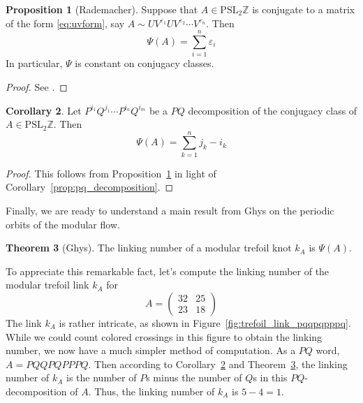\documentclass[12pt,twoside]{reedthesis}
\theoremstyle{definition}
\newtheorem{thm}{Theorem}[chapter]
\newtheorem{cor}[thm]{Corollary}
\newtheorem{prop}[thm]{Proposition}
\newcommand{\Z}{\mathbb{Z}}
\newcommand{\PSLZ}{\mathrm{PSL}_2{\Z}}
\begin{document}
\begin{prop}[Rademacher]\label{prop:rademacher_class_sum}
  Suppose that $A \in \PSLZ$ is conjugate to a matrix of the form \eqref{eq:uvform}, say $A \sim U V^{\varepsilon_1} U V^{\varepsilon_2} \cdots V^{\varepsilon_{n}}$.
  Then
  \begin{equation*}
    \Psi(A) = \sum_{i=1}^n \varepsilon_i
  \end{equation*}
  In particular, $\Psi$ is constant on conjugacy classes.
\end{prop}

\begin{proof}
  See \cite[58-60]{rademacher1972}.
\end{proof}

\begin{cor}\label{cor:rademacher_class_function_pq}
  Let $P^{i_1} Q^{j_1} \cdots P^{i_n} Q^{i_m}$ be a $PQ$ decomposition of the conjugacy class of $A \in \PSLZ$.
  Then
  \begin{equation*}
    \Psi(A) = \sum_{k=1}^n j_k - i_k
  \end{equation*}
\end{cor}

\begin{proof}
  This follows from Proposition~\ref{prop:rademacher_class_sum} in light of Corollary~\ref{prop:pq_decomposition}.
\end{proof}

Finally, we are ready to understand a main result from Ghys on the periodic orbits of the modular flow.

\begin{thm}[Ghys]\label{thm:ghys}
  The linking number of a modular trefoil knot $k_A$ is $\Psi(A)$.
\end{thm}

To appreciate this remarkable fact, let's compute the linking number of the modular trefoil link $k_A$ for
\begin{equation*}
  A = \begin{pmatrix}
    32 & 25 \\ 
    23 & 18
  \end{pmatrix}
\end{equation*}
The link $k_A$ is rather intricate, as shown in Figure~\ref{fig:trefoil_link_pqqpqpppq}.
While we could count colored crossings in this figure to obtain the linking number, we now have a much simpler method of computation.
As a $PQ$ word, $A = PQQPQPPPQ$.
Then according to Corollary~\ref{cor:rademacher_class_function_pq} and Theorem~\ref{thm:ghys}, the linking number of $k_A$ is the number of $P$s minus the number of $Q$s in this $PQ$-decomposition of $A$. 
Thus, the linking number of $k_A$ is $5 - 4 = 1$.
\end{document}
